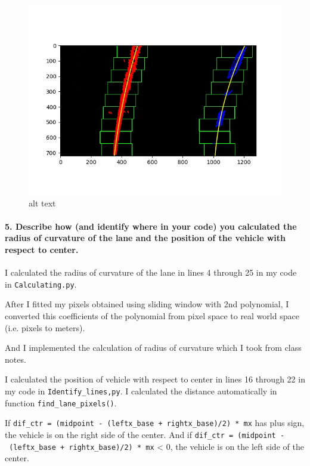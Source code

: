 \documentclass[11pt]{article}
\makeatletter
\def\maxwidth{\ifdim\Gin@nat@width>\linewidth\linewidth
    \else\Gin@nat@width\fi}
\let\Oldincludegraphics\includegraphics
\renewcommand{\includegraphics}[1]{\Oldincludegraphics[width=.8\maxwidth]{#1}}
\makeatother
\begin{document}
\begin{figure}
\centering
\includegraphics{./output_images/general_sliding_window/lines_Identified_test6.jpg}
\caption{alt text}
\end{figure}

\paragraph{5. Describe how (and identify where in your code) you
calculated the radius of curvature of the lane and the position of the
vehicle with respect to
center.}\label{describe-how-and-identify-where-in-your-code-you-calculated-the-radius-of-curvature-of-the-lane-and-the-position-of-the-vehicle-with-respect-to-center.}

I calculated the radius of curvature of the lane in lines 4 through 25
in my code in \texttt{Calculating.py}.

After I fitted my pixels obtained using sliding window with 2nd
polynomial, I converted this coefficients of the polynomial from pixel
space to real world space (i.e. pixels to meters).

And I implemented the calculation of radius of curvature which I took
from class notes.

I calculated the position of vehicle with respect to center in lines 16
through 22 in my code in \texttt{Identify\_lines,py}. I calculated the
distance automatically in function \texttt{find\_lane\_pixels()}.

If
\texttt{dif\_ctr\ =\ (midpoint\ -\ (leftx\_base\ +\ rightx\_base)/2)\ *\ mx}
has plus sign, the vehicle is on the right side of the center. And if
\texttt{dif\_ctr\ =\ (midpoint\ -\ (leftx\_base\ +\ rightx\_base)/2)\ *\ mx}
\textless{} 0, the vehicle is on the left side of the center.
\end{document}
